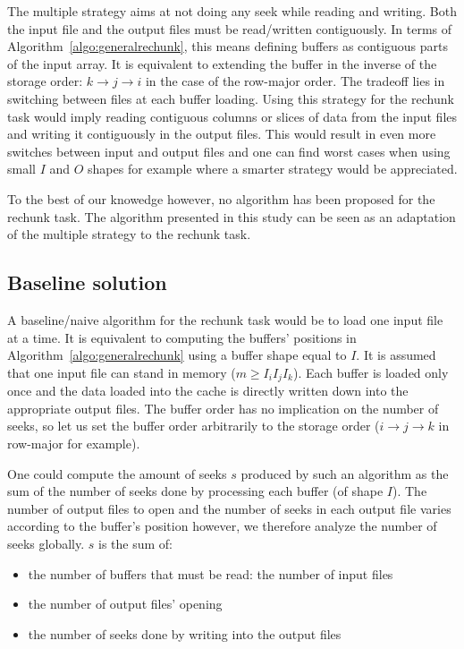 \documentclass[conference]{IEEEtran}
\begin{document}
The multiple strategy aims at not doing any seek while reading and writing.
Both the input file and the output files must be read/written contiguously. In
terms of Algorithm~\ref{algo:generalrechunk}, this means defining buffers as
contiguous parts of the input array. It is equivalent to extending the buffer
in the inverse of the storage order: $k \rightarrow j \rightarrow i$ in the case
of the row-major order. The tradeoff lies in switching between files
at each buffer loading. Using this strategy for the rechunk task would imply
reading contiguous columns or slices of data from the input files and writing it
contiguously in the output files. This would result in even more switches
between input and output files and one can find worst cases when using small
$I$ and $O$ shapes for example where a smarter strategy would be appreciated.

To the best of our knowedge however, no algorithm has been proposed for the
rechunk task. The algorithm presented in this study can be seen as an
adaptation of the multiple strategy to the rechunk task.

\subsection{Baseline solution}

A baseline/naive algorithm for the rechunk task would be to load one input file
at a time. It is equivalent to computing the buffers' positions in
Algorithm~\ref{algo:generalrechunk} using a buffer shape equal to $I$.
It is assumed that one input file can stand in memory ($m \geq I_iI_jI_k$). Each
buffer is loaded only once and the data loaded into the cache is directly
written down into the appropriate output files. The buffer order has no
implication on the number of seeks, so let us set the buffer order arbitrarily
to the storage order ($i \rightarrow j \rightarrow k$ in row-major for example).

One could compute the amount of seeks $s$ produced by such an algorithm as the
sum of the number of seeks done by processing each buffer (of shape $I$). The
number of output files to open and the number of seeks in each output file varies
according to the buffer's position however, we therefore analyze the number of
seeks globally. $s$ is the sum of:
\begin{itemize}
  \item the number of buffers that must be read: the number of input files
  \item the number of output files' opening
  \item the number of seeks done by writing into the output files
\end{itemize}
\end{document}
